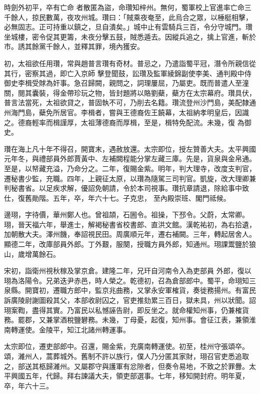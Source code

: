 \begin{pinyinscope}
 時劍外初平，卒有亡命
 者散匿為盜，命瓚知梓州。無何，蜀軍校上官進率亡命三千餘人，掠民數萬，夜攻州城。瓚曰：「賊乘夜奄至，此烏合之眾，以棰梃相擊，必無固志。正可持重以鎮之，旦自潰矣。」城中止有雲騎兵三百，令分守城門。瓚坐城樓，密令促其更籌，未夜分擊五鼓，賊悉遁去。因縱兵追之，擒上官進，斬於市。誘其餘黨千餘人，並釋其罪，境內獲安。



 初，太祖欲任用瓚，常與趙普言瓚有奇材。普忌之，乃遣詣蜀平冠，潛令所親信從其行，密察其過，即亡入京師
 擊登聞鼓，訟瓚及監軍綾錦副使李美、通判殿中侍御史李楫受賕為奸事。急召歸闕，親問之，詞理屢屈，乃屬吏。既而普遣人至潼關，閱其囊裝，得金帶珍玩之物，皆封題將以賂劉蘗，蘗方在太宗幕府。瓚具伏，普言法當死，太祖欲貸之，普固執不可，乃削去名籍。瓚流登州沙門島，美配隸通州海門島，蘗免所居官。李楫者，嘗與王德裔佐王饒幕，太祖納孝明皇后，因識之。德裔輕率而楫謹厚，太祖薄德裔而厚楫，至是，楫特免配流。未幾，復
 為御史。



 瓚在海上凡十年不得召，開寶末，遇赦放還。太宗即位，授左贊善大夫。太平興國元年冬，與禮部員外郎賈黃中、左補闕程能分掌左藏三庫。先是，貨泉與金帛通。至是，以帑藏充溢，乃命分之。二年，復賜金紫。明年，判大理寺，改度支判官，遷秘書少監，充職。四年，上親征太原，以瓚為隨駕三司判官。凱旋，改大理卿兼判秘書省。以足疾求解，優詔免朝請，令於本司視事。瓚抗章請退，除給事中致仕，復舊勛階。五年，卒，年六十七。子克忠，
 至內殿崇班、閣門祗候。



 邊珝，字待價，華州鄭人也。曾祖頡，石圌令。祖操，下邳令。父蔚，太常卿。珝，晉天福六年，舉進士，解褐秘書省校書郎、直洪文館。漢乾祐初，為右拾遺，加朝散大夫。澤州饑，奉詔視民田。周廣順元年，遷右補闕。三年，轉起居舍人。顯德二年，改庫部員外郎。丁外艱，服闋，授職方員外郎，知通州。珝課鬻鹽於狼山，歲增萬餘石。



 宋初，詣衛州視秋稼及掌京倉。建隆二年，兄玕自河南令入為吏部員
 外郎，復以珝為洛陽令。兄弟迭尹赤邑，時人榮之。乾德初，召為倉部郎中。蜀平，命珝知三泉縣。開寶初，遷職方郎中，監京兆曲務，又掌永安軍榷貨，奏徙務揚州。有富民訴廣陵尉謝圖殺其父，本部收尉囚之，官吏推劾累三百日，獄未具，州以狀聞。詔珝案鞫，盡得其實。乃富民以私憾誣告尉，即反坐之。就命權知州事，仍兼榷貨務。罷郡，又兼掌酒稅鹽礬務。未幾，丁母憂，起復，知州事。會征江表，兼領淮南轉運使。金陵平，知江北諸州轉運事。



 太宗即位，遷吏部郎中。召還，賜金紫，充廣南轉運使。初至，桂州守張頌卒。頌，濰州人，蒿葬城外。舊制不許以族行，僕人乃分匿其家財，珝召官吏悉追取之，部送其柩歸濰州。又屬郡守與護軍有忿隙者，但奏令易地，不致之於罪釁。太平興國五年，代歸。拜右諫議大夫，領吏部選事。七年，移知開封府。明年夏，卒，年六十三。




\end{pinyinscope}
